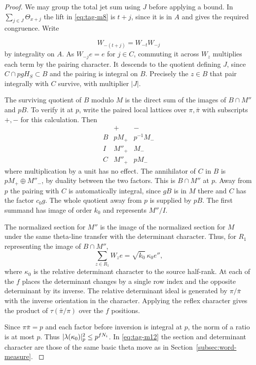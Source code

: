 \begin{proof}
We may group the total jet sum using \(J\) before
applying a bound. In \(\sum_{j\in J}\Theta_{x+j}\)
the lift in \eqref{eq:tag-m8} is \(t+j\), since it is in \(A\)
and gives the required congruence. Write

\[
  W_{-(t+j)}=W_{-t}W_{-j}
\]
 by integrality on \(A\).
As \(W_{-j}e=e\) for \(j\in C\), commuting it across
\(W_z\) multiplies each term by the pairing character.
It descends to the quotient defining \(J\), since
\(C\cap pgH_S\subset B\) and the pairing is integral
on \(B\). Precisely the \(z\in B\) that pair
integrally with \(C\) survive, with multiplier \(|J|\).

The surviving quotient of \(B\) modulo \(M\) is
the direct sum of the images of \(B\cap M''\) and
\(pB\). To verify it at \(p\), write the paired
local lattices over \(\pi,\bar\pi\) with subscripts
\(+,-\) for this calculation. Then
\[
 \begin{array}{c|cc}
      &+&-\\ \hline
 B   &pM_+&p^{-1}M_-\\
 I   &M''_+&M_-\\
 C   &M''_+&pM_-
 \end{array}
\]
where multiplication by a unit has no effect. The
annihilator of \(C\) in \(B\) is
\(pM_+\oplus M''_-\), by duality between the
two factors. This is \(B\cap M''\) at \(p\).
Away from \(p\) the pairing with \(C\) is
automatically integral, since \(gB\) is in \(M\)
there and \(C\) has the factor \(c_0g\).
The whole quotient away from \(p\) is supplied
by \(pB\). The first summand has image of
order \(k_0\) and represents \(M''/I\).
\label{cor:word-projection-3}

The normalized section for \(M''\) is the image
of the normalized section for \(M\) under the
same theta-line transfer with the determinant
character. Thus, for \(R_1\) representing the
image of \(B\cap M''\),
\[
                       \sum_{z\in R_1} W_z e
                         =\sqrt{k_0}\,\kappa_0 e'',
\tag{M12}\label{eq:tag-m12}
\]
where \(\kappa_0\) is the relative determinant
character to the source half-rank. At each of
the \(f\) places the determinant changes by a
single row index and the opposite determinant
by its inverse. The relative determinant ideal
is generated by \(\pi/\bar\pi\) with the inverse
orientation in the character. Applying the
reflex character gives the product of
\(\tau(\bar\pi/\pi)\) over the \(f\) positions.

Since \(\pi\bar\pi=p\) and each factor before
inversion is integral at \(p\), the norm of a
ratio is at most \(p\). Thus
\(\lvert\lambda(\kappa_0)\rvert_p^2\le p^{fN_i}\).
In \eqref{eq:tag-m12} the section and determinant character
are those of the same basic theta move as in
Section~\ref{subsec:word-measure}.
\label{cor:word-projection-4}


\end{proof}
